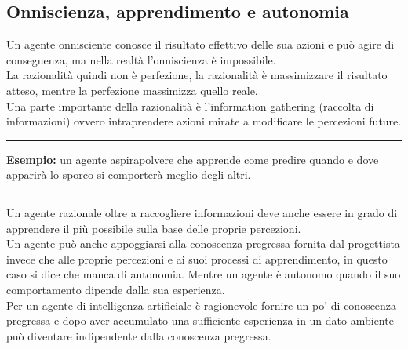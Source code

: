 \documentclass{article}
\begin{document}
\subsection{Onniscienza, apprendimento e autonomia}
Un agente onnisciente conosce il risultato effettivo delle sua azioni e può agire di conseguenza, ma nella realtà l'onniscienza è impossibile.\\
La razionalità quindi non è perfezione, la razionalità è massimizzare il risultato atteso, mentre la perfezione massimizza quello reale.\\
Una parte importante della razionalità è l'information gathering (raccolta di informazioni) ovvero intraprendere azioni mirate a modificare le percezioni future. \\
\par\noindent\rule{\textwidth}{0.4pt}
\textbf{Esempio: }un agente aspirapolvere che apprende come predire quando e dove apparirà lo sporco si comporterà meglio degli altri.
\par\noindent\rule{\textwidth}{0.4pt}
Un agente razionale oltre a raccogliere informazioni deve anche essere in grado di apprendere il più possibile sulla base delle proprie percezioni.\\ 
Un agente può anche appoggiarsi alla conoscenza pregressa fornita dal progettista invece che alle proprie percezioni e ai suoi processi di apprendimento, in questo caso si dice che manca di autonomia. Mentre un agente è autonomo quando il suo comportamento dipende dalla sua esperienza. \\
Per un agente di intelligenza artificiale è ragionevole fornire un po' di conoscenza pregressa e dopo aver accumulato una sufficiente esperienza in un dato ambiente può diventare indipendente dalla conoscenza pregressa.
\newpage
\end{document}
